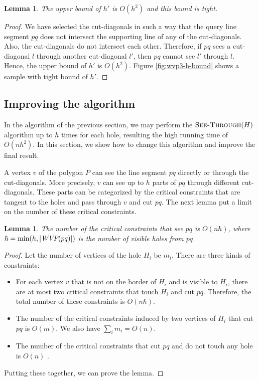 \documentclass[5p]{elsarticle}
\newtheorem{lemma}[theorem]{Lemma}
\def\WVP{\mbox{\it{WVP}}}
\def\P{\mbox{${P}$}}
\def\SeeThrough{\mbox{\textsc{See-Through}}}
\begin{document}
\begin{lemma}
The upper bound of $h'$ is $O(h^2)$ and this bound is tight.
\end{lemma}
\begin{proof}
We have selected the cut-diagonals in such a way that 
the query line segment $pq$ does not intersect the supporting line of any of 
the cut-diagonals. 
Also, the cut-diagonals do not intersect each other.
Therefore, if $pq$ sees a cut-diagonal $l$ through another cut-diagonal $l'$, then 
$pq$ cannot see $l'$ through $l$. Hence, the upper bound of $h'$ is $O(h^2)$. 
Figure \ref{fig:wvp3-h-bound} shows a sample with tight bound of $h′$.
\end{proof}

\subsection{Improving the algorithm}

In the algorithm of the previous section, we may perform the $\SeeThrough(H)$ algorithm
up to $h$ times for each hole, resulting the high running time of $O(nh^2)$. 
In this section, we show how to change this algorithm and improve the final result. 

A vertex $v$ of the polygon $\P$ can see the line segment $pq$ directly or through the 
cut-diagonals. More precisely, $v$ can see up to $h$ parts of $pq$ through different cut-diagonals. 
These parts can be categorized by the critical constraints that are tangent to the holes
and pass through $v$ and cut $pq$. The next lemma put a limit on the number of these critical 
constraints.

\begin{lemma}
The number of the critical constraints that see $pq$ is $O(n\hbar)$, where
$\hbar = \min(h, |\WVP(pq)|)$ is the number of visible holes from $pq$.
\end{lemma}
\begin{proof}
Let the number of vertices of the hole $H_i$ be $m_i$. 
There are three kinds of constraints: 
\begin{itemize}
\item For each vertex $v$ that is not on the 
border of $H_i$ and is visible to $H_i$, there are at most two critical constraints that 
touch $H_i$ and cut $pq$. Therefore, the total number of these constraints is $O(n\hbar)$.
\item The number of the critical constraints 
induced by two vertices of $H_i$ that cut $pq$ is $O(m)$. We also have $\sum_i m_i = O(n)$.
\item The number of the critical constraints that cut $pq$ and do not touch any hole is 
$O(n)$ \cite{bose}.
\end{itemize}
Putting these together, we can prove the lemma.
\end{proof}
\end{document}
